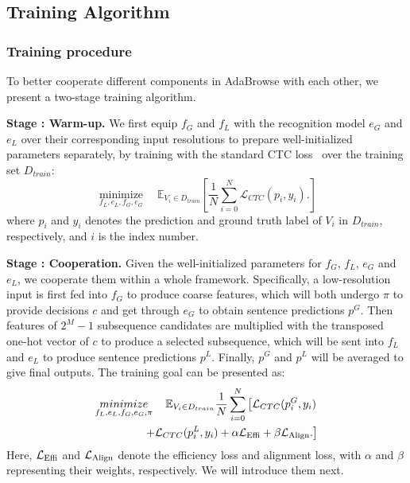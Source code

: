 \documentclass[sigconf]{acmart}
\begin{document}
\subsection{Training Algorithm}
\subsubsection{Training procedure}
To better cooperate different components in AdaBrowse with each other, we present a two-stage training algorithm.
  
\textbf{Stage \uppercase\expandafter{}: Warm-up.} We first equip $f_G$ and $f_L$ with the recognition model $e_G$ and $e_L$ over their corresponding input resolutions to prepare well-initialized parameters separately, by training with the standard CTC loss~\cite{graves2006connectionist} over the training set $D_{train}$: 
  \begin{equation}
    \label{e6}
    \mathop{minimize}\limits_{f_L, e_L, f_G, e_G} \quad \mathbb{E}_{V_i\in D_{train}}\left[\frac{1}{N}\sum_{i=0}^N \mathcal{L}_{CTC}(p_i, y_i).\right] 
    \end{equation}
where $p_i$ and $y_i$ denotes the prediction and ground truth label of $V_i$ in $D_{train}$, respectively, and $i$ is the index number.   
  
\textbf{Stage \uppercase\expandafter{}: Cooperation.}
Given the well-initialized parameters for $f_G$, $f_L$, $e_G$ and $e_L$, we cooperate them within a whole framework. Specifically, a low-resolution input is first fed into $f_G$ to produce coarse features, which will both undergo $\pi$ to provide decisions $c$ and get through $e_G$ to obtain sentence predictions $p^G$. Then features of $2^M-1$ subsequence candidates are multiplied with the transposed one-hot vector of $c$ to produce a selected subsequence, which will be sent into $f_L$ and $e_L$ to produce sentence predictions $p^L$. Finally, $p^G$ and $p^L$ will be averaged to give final outputs. The training goal can be presented as: 
  \begin{equation}
    \begin{aligned}
    \label{e7}
    \mathop{minimize}\limits_{f_L, e_L, f_G, e_G, \pi} \quad \mathbb{E}_{V_i\in D_{train}}   \frac{1}{N}\sum_{i=0}^N \left[ \mathcal{L}_{CTC}(p^G_i, y_i) \notag\right. \\  
    \left.  + \mathcal{L}_{CTC}(p^L_i, y_i) + \alpha \mathcal{L}_{{\rm Effi}} + \beta \mathcal{L}_{{\rm Align}}. \right]
    \end{aligned}
    \end{equation}
  Here, $\mathcal{L}_{{\rm Effi}}$ and $\mathcal{L}_{{\rm Align}}$ denote the efficiency loss and alignment loss, with $\alpha$ and $\beta$ representing their weights, respectively. We will introduce them next.
\end{document}
